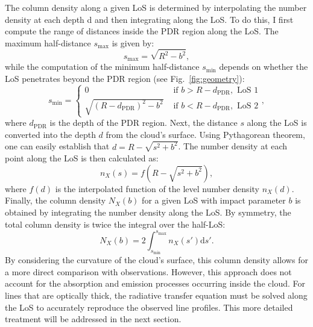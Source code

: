 \documentclass[12pt,a4paper]{article}
\newcommand{\mr}{\mathrm}
\newcommand{\dd}[1]{\mathrm{d}#1}
\begin{document}
The column density along a given LoS is determined by interpolating the number density at each depth d and then integrating along the LoS. To do this, I first compute the range of distances inside the PDR region along the LoS. The maximum half-distance $s_{\max}$ is given by:
\begin{equation}
    s_{\max} = \sqrt{R^2 - b^2},
\end{equation}
while the computation of the minimum half-distance $s_{\min}$ depends on whether the LoS penetrates beyond the PDR region (see Fig.~\ref{fig:geometry}):
\begin{equation}
    s_{\min} = \left\{\begin{array}{ll}
       0  &  \text{ if } b > R - d_\mr{PDR}, \text{ LoS 1} \\
       \sqrt{(R - d_\mr{PDR})^2 - b^2}  &  \text{ if } b < R - d_\mr{PDR}, \text{ LoS 2}
    \end{array}\right.,
\end{equation}
where $d_\mr{PDR}$ is the depth of the PDR region. Next, the distance $s$ along the LoS is converted into the depth $d$ from the cloud's surface. Using Pythagorean theorem, one can easily establish that $d = R - \sqrt{s^2 + b^2}$. The number density at each point along the LoS is then calculated as:
\begin{equation}
    n_X(s) = f(R - \sqrt{s^2 + b^2}),
\end{equation}
where $f(d)$ is the interpolated function of the level number density $n_X(d)$. Finally, the column density $N_X(b)$ for a given LoS with impact parameter $b$ is obtained by integrating the number density along the LoS. By symmetry, the total column density is twice the integral over the half-LoS: 
\begin{equation}
    N_X(b) = 2\int_{s_{\min}}^{s_{\max}} n_X(s') \dd{s'}.
\end{equation}
By considering the curvature of the cloud's surface, this column density allows for a more direct comparison with observations. However, this approach does not account for the absorption and emission processes occurring inside the cloud. For lines that are optically thick, the radiative transfer equation must be solved along the LoS to accurately reproduce the observed line profiles. This more detailed treatment will be addressed in the next section.
\end{document}
